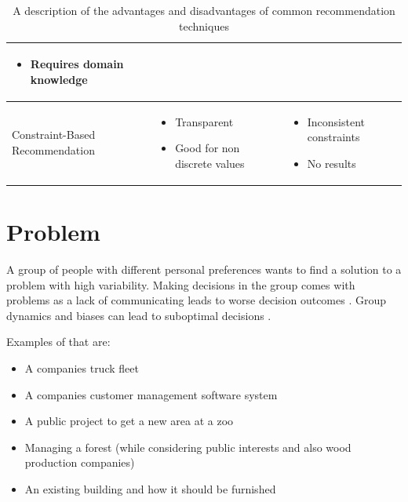 \documentclass{article}
\begin{document}
\begin{table}
\begin{center}
\begin{tabularx}{\columnwidth}{X|X|X}
\begin{itemize}
                    \item Requires domain knowledge
                \end{itemize} \\
            \hline
            Constraint-Based Recommendation 
            &   \begin{itemize}
                    \item Transparent
                    \item Good for non discrete values
                \end{itemize}
            &   \begin{itemize}
                    \item Inconsistent constraints
                    \item No results
                \end{itemize} \\ 
        \end{tabularx}
        \caption{A description of the advantages and disadvantages of common recommendation techniques}
        \label{tab:RecommenderComparison}
    \end{center}
\end{table}

\FloatBarrier

\section{Problem}
A group of people with different personal preferences wants to find a solution to a problem with high variability. Making decisions in the group comes with problems as a lack of communicating leads to worse decision outcomes \cite{atasItemRecommendationUsing2017}. Group dynamics and biases can lead to suboptimal decisions \cite{kerrBiasJudgmentComparing1996}. 

Examples of that are:
\begin{itemize}
    \item A companies truck fleet
    \item A companies customer management software system
    \item A public project to get a new area at a zoo
    \item Managing a forest (while considering public interests and also wood production companies)
    \item An existing building and how it should be furnished
\end{itemize}
\end{document}
